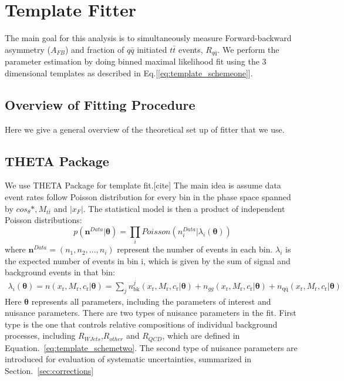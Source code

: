 \section{Template Fitter}
\label{chapter:fitter}

The main goal for this analysis is to simultaneously measure Forward-backward asymmetry ($A_{FB}$) and fraction of $q\bar{q}$ initiated $t\bar{t}$ events, $R_{q\bar{q}}$. We perform the parameter estimation by doing binned maximal likelihood fit using the 3 dimensional templates as described in Eq.[\ref{eq:template_schemeone}].  

\subsection{Overview of Fitting Procedure}
Here we give a general overview of the theoretical set up of fitter that we use.

\subsection{THETA Package}
\label{sec:theta_methods}
We use THETA Package for template fit.[cite] The main idea is assume data event rates follow Poisson distribution for every bin in the phase space spanned by $cos_\theta*,M_{t\bar{t}}$ and $|x_F|$. The statistical model is then a product of independent Poisson distributions:
\begin{equation}
p(\bm{n}^{Data}|\bm\theta)=\prod_i Poisson(n_i^{Data}|\lambda_i(\bm\theta))
\label{eq:theta_likelihood}
\end{equation}
where $\bm{n}^{Data}=(n_1,n_2,...,n_i)$ represent the number of events in each bin. $\lambda_i$ is the expected number of events in bin i, which is given by the sum of signal and background events in that bin:
\begin{align}
\lambda_i(\bm\theta) = n(x_\mathrm{r},M_\mathrm{r},c_\mathrm{r}|\bm\theta) = \sum_j n^j_\mathrm{bk}(x_\mathrm{r},M_\mathrm{r},c_\mathrm{r}|\bm\theta)+n_{gg}(x_\mathrm{r},M_\mathrm{r},c_\mathrm{r}|\bm\theta) +n_\mathrm{q\bar{q}}(x_\mathrm{r}, M_\mathrm{r}, c_\mathrm{r}|\bm\theta)
\label{eq:theta_exp_evts}
\end{align}
Here $\bm\theta$ represents all parameters, including the parameters of interest and nuisance parameters. There are two types of nuisance parameters in the fit. First type is the one that controls relative compositions of individual background processes, including $R_{WJets}$,$R_{other}$ and $R_{QCD}$, which are defined in Equation.~\ref{eq:template_schemetwo}. The second type of nuisance parameters are introduced for evaluation of systematic uncertainties, summarized in Section.~\ref{sec:corrections}

